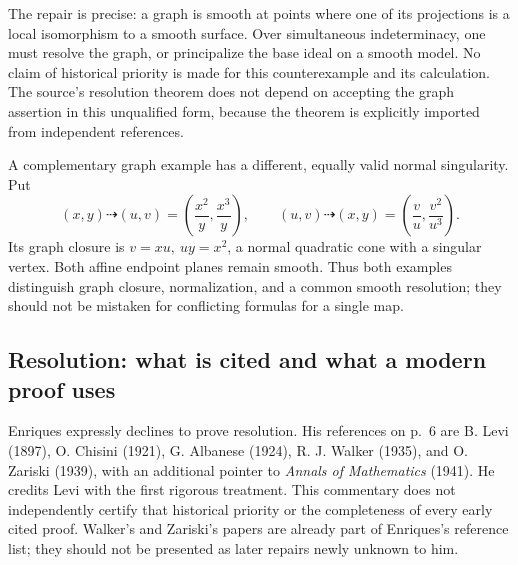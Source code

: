 The repair is precise: a graph is smooth at points where one of its projections is a local isomorphism to a smooth surface. Over simultaneous indeterminacy, one must resolve the graph, or principalize the base ideal on a smooth model. No claim of historical priority is made for this counterexample and its calculation. The source's resolution theorem does not depend on accepting the graph assertion in this unqualified form, because the theorem is explicitly imported from independent references.

A complementary graph example has a different, equally valid normal singularity. Put \[
(x,y)\dashrightarrow(u,v)=\left(\frac{x^2}{y},\frac{x^3}{y}\right),
\qquad (u,v)\dashrightarrow(x,y)=\left(\frac vu,\frac{v^2}{u^3}\right).
\] Its graph closure is \(v=xu,\ uy=x^2\), a normal quadratic cone with a singular vertex. Both affine endpoint planes remain smooth. Thus both examples distinguish graph closure, normalization, and a common smooth resolution; they should not be mistaken for conflicting formulas for a single map.

\subsection{Resolution: what is cited and what a modern proof uses}

Enriques expressly declines to prove resolution. His references on p.~6 are B. Levi (1897), O. Chisini (1921), G. Albanese (1924), R. J. Walker (1935), and O. Zariski (1939), with an additional pointer to \emph{Annals of Mathematics} (1941). He credits Levi with the first rigorous treatment. This commentary does not independently certify that historical priority or the completeness of every early cited proof. Walker's and Zariski's papers are already part of Enriques's reference list; they should not be presented as later repairs newly unknown to him.

